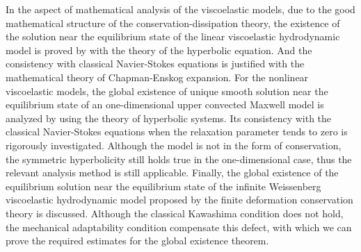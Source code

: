 \begin{eabstract}
  In the aspect of mathematical analysis of the viscoelastic models, due to the good mathematical structure of the conservation-dissipation theory, the existence of the solution near the equilibrium state of the linear viscoelastic hydrodynamic model is proved by with the theory of the hyperbolic equation. And the consistency with classical Navier-Stokes equations is justified with the mathematical theory of Chapman-Enskog expansion. For the nonlinear viscoelastic models, the global existence of unique smooth solution near the equilibrium state of an one-dimensional upper convected Maxwell model is analyzed by using the theory of hyperbolic systems. Its consistency with the classical Navier-Stokes equations when the relaxation parameter tends to zero is rigorously investigated. Although the model is not in the form of conservation, the symmetric hyperbolicity still holds true in the one-dimensional case, thus the relevant analysis method is still applicable. Finally, the global existence of the equilibrium solution near the equilibrium state of the infinite Weissenberg viscoelastic hydrodynamic model proposed by the finite deformation conservation theory is discussed. Although the classical Kawashima condition does not hold, the mechanical adaptability condition compensate this defect, with which we can prove the required estimates for the global existence theorem.

\end{eabstract}


